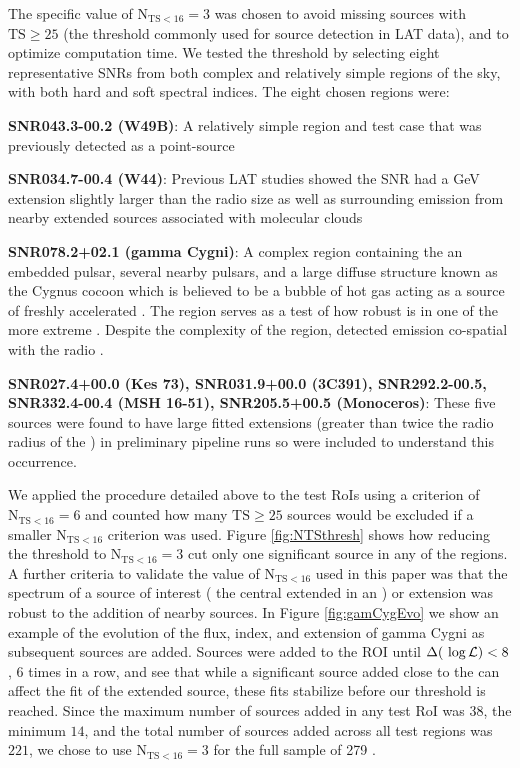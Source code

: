 The specific value of $\mathrm{N_{TS < 16} = 3}$ was chosen to avoid missing sources with $\mathrm{TS \geq 25}$ (the threshold commonly used for source detection in LAT data), and to optimize computation time. We tested the threshold by selecting eight representative SNRs from both complex and relatively simple regions of the sky, with both hard and soft spectral indices. The eight chosen regions were:

{\bfseries SNR043.3-00.2 (W49B)}: A relatively simple region and test case that was previously detected as a point-source  \snr{} \citep{Abdo10-W49B}

{\bfseries SNR034.7-00.4 (W44)}: Previous LAT studies showed the SNR had a GeV extension slightly larger than the radio size as well as surrounding\gev{} emission from nearby extended sources associated with molecular clouds \citep{Abdo10-W44,Uchiyama12-W44Vicin}

{\bfseries SNR078.2+02.1 (gamma Cygni)}: A complex region containing the \snr{} an embedded pulsar, several nearby pulsars, and a large diffuse structure known as the Cygnus cocoon which is believed to be a bubble of hot gas acting as a source of freshly accelerated \crs{} \citep{Ackermann12-CygnusCR,Ackermann11-CygnusCocoon}. The region serves as a test of how robust \srcs{} is in one of the more extreme \rois{}. Despite the complexity of the region, \cite{Lande12} detected \gev{} emission co-spatial with the radio \snr{}.

{\bfseries SNR027.4+00.0 (Kes 73), SNR031.9+00.0 (3C391), SNR292.2-00.5, SNR332.4-00.4 (MSH 16-51), SNR205.5+00.5 (Monoceros)}: These five  sources were found to have large fitted extensions (greater than twice the radio radius of the \snr{}) in preliminary \snrcat{} pipeline runs so were included to understand this occurrence.

We applied the procedure detailed above to the test RoIs using a criterion of $\mathrm{N_{TS < 16} = 6}$ and counted how many $\mathrm{TS \geq 25}$ sources would be excluded if a smaller $\mathrm{N_{TS < 16}}$ criterion was used. Figure \ref{fig:NTSthresh} shows how reducing the threshold to $\mathrm{N_{TS < 16} = 3}$ cut only one significant source in any of the regions. A further criteria to validate the value of $\mathrm{N_{TS < 16}}$ used in this paper was that the spectrum of a source of interest (\ie{} the central extended \snr{} in an \roi{}) or extension was robust to the addition of nearby sources. In Figure \ref{fig:gamCygEvo} we show an example of the evolution of the flux, index, and extension of \snr{} gamma Cygni  as subsequent sources are added.  Sources were added to the ROI until $\Delta(~\mathrm{\log\mathcal{L}}{}) < 8$, 6 times in a row, and see that while a significant source added close to the \snr{} can affect the fit of the extended source, these fits stabilize before our threshold is reached. Since the maximum number of sources added in any test RoI was $38$, the minimum $14$, and the total number of sources added across all test regions was $221$, we chose to use $\mathrm{N_{TS < 16} = 3}$ for the full sample of 279 \rois{}. 

